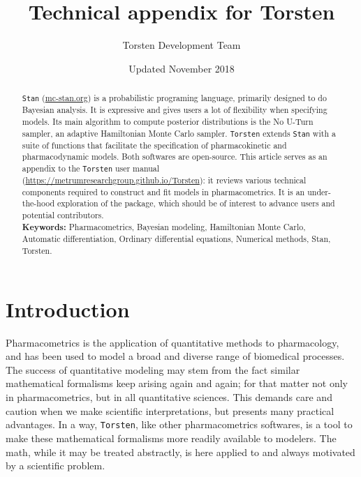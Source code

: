 \documentclass[11pt]{article}
\title{\textbf{Technical appendix for Torsten}}
\author{Torsten Development Team}
\date{Updated November 2018}
\begin{document}
\maketitle

\begin{abstract}
  \texttt{Stan} (\url{mc-stan.org}) is a probabilistic programing language, primarily designed to do Bayesian analysis.
  It is expressive and gives users a lot of flexibility when specifying models.
  Its main algorithm to compute posterior distributions is the No U-Turn sampler,
  an adaptive Hamiltonian Monte Carlo sampler.
  \texttt{Torsten} extends \texttt{Stan} with a suite of functions that facilitate the specification
  of pharmacokinetic and pharmacodynamic models.
  Both softwares are open-source.
  This article serves as an appendix to the \texttt{Torsten} 
  user manual (\url{https://metrumresearchgroup.github.io/Torsten}):
  it reviews various technical components required to construct and fit models in
  pharmacometrics. It is an under-the-hood exploration of the package, which should be of
  interest to advance users and potential contributors.  \\
  
  \noindent \textbf{Keywords:} Pharmacometrics, Bayesian modeling, Hamiltonian Monte Carlo,
  Automatic differentiation, Ordinary differential equations, Numerical methods, Stan, Torsten.
\end{abstract}

\clearpage

\tableofcontents

\clearpage

\section{Introduction}\label{introduction}

  Pharmacometrics is the application of quantitative methods to pharmacology,
  and has been used to model a broad and diverse range of biomedical 
  processes. The success of quantitative modeling may stem from the
  fact similar mathematical formalisms keep arising again and again; for
  that matter not only in pharmacometrics, but in all quantitative sciences.
  This demands care and caution when we make scientific interpretations, but
  presents many practical advantages. In a way, \texttt{Torsten},
  like other pharmacometrics 
  softwares, is a tool to make these mathematical formalisms more readily 
  available to modelers. The math, while it may be treated abstractly, is here applied
  to and always motivated by a scientific problem.
\end{document}

